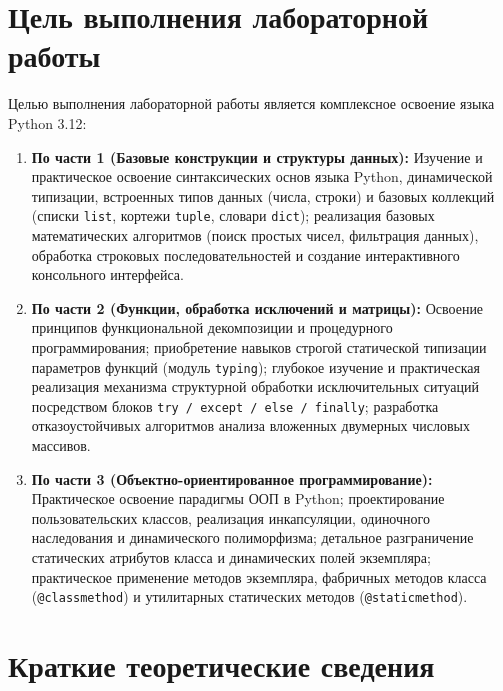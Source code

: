 \documentclass[14pt,a4paper]{extarticle}
\begin{document}
\setcounter{page}{2}

\section{Цель выполнения лабораторной работы}

Целью выполнения лабораторной работы является комплексное освоение языка Python 3.12:
\begin{enumerate}
    \item \textbf{По части 1 (Базовые конструкции и структуры данных):} Изучение и практическое освоение синтаксических основ языка Python, динамической типизации, встроенных типов данных (числа, строки) и базовых коллекций (списки \texttt{list}, кортежи \texttt{tuple}, словари \texttt{dict}); реализация базовых математических алгоритмов (поиск простых чисел, фильтрация данных), обработка строковых последовательностей и создание интерактивного консольного интерфейса.
    \item \textbf{По части 2 (Функции, обработка исключений и матрицы):} Освоение принципов функциональной декомпозиции и процедурного программирования; приобретение навыков строгой статической типизации параметров функций (модуль \texttt{typing}); глубокое изучение и практическая реализация механизма структурной обработки исключительных ситуаций посредством блоков \texttt{try / except / else / finally}; разработка отказоустойчивых алгоритмов анализа вложенных двумерных числовых массивов.
    \item \textbf{По части 3 (Объектно-ориентированное программирование):} Практическое освоение парадигмы ООП в Python; проектирование пользовательских классов, реализация инкапсуляции, одиночного наследования и динамического полиморфизма; детальное разграничение статических атрибутов класса и динамических полей экземпляра; практическое применение методов экземпляра, фабричных методов класса (\texttt{@classmethod}) и утилитарных статических методов (\texttt{@staticmethod}).
\end{enumerate}

\clearpage
\section{Краткие теоретические сведения}
\end{document}

